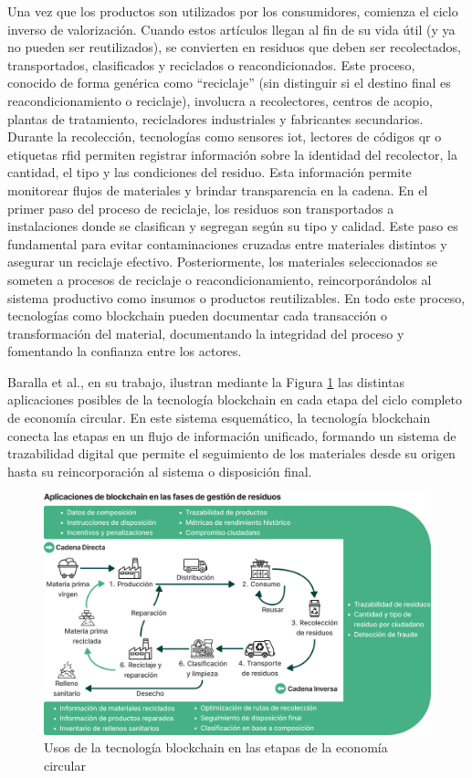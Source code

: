 Una vez que los productos son utilizados por los consumidores, comienza el ciclo inverso de valorización. Cuando estos artículos llegan al fin de su vida útil (y ya no pueden ser reutilizados), se convierten en residuos que deben ser recolectados, transportados, clasificados y reciclados o reacondicionados. Este proceso, conocido de forma genérica como ``reciclaje'' (sin distinguir si el destino final es reacondicionamiento o reciclaje), involucra a recolectores, centros de acopio, plantas de tratamiento, recicladores industriales y fabricantes secundarios. Durante la recolección, tecnologías como sensores \acrshort{iot}, lectores de códigos \acrshort{qr} o etiquetas \acrshort{rfid} permiten registrar información sobre la identidad del recolector, la cantidad, el tipo y las condiciones del residuo. Esta información permite monitorear flujos de materiales y brindar transparencia en la cadena. En el primer paso del proceso de reciclaje, los residuos son transportados a instalaciones donde se clasifican y segregan según su tipo y calidad. Este paso es fundamental para evitar contaminaciones cruzadas entre materiales distintos y asegurar un reciclaje efectivo. Posteriormente, los materiales seleccionados se someten a procesos de reciclaje o reacondicionamiento, reincorporándolos al sistema productivo como insumos o productos reutilizables. En todo este proceso, tecnologías como blockchain pueden documentar cada transacción o transformación del material, documentando la integridad del proceso y fomentando la confianza entre los actores.

Baralla et al., en su trabajo, ilustran mediante la Figura \ref{fig:baralla-model-1} las distintas aplicaciones posibles de la tecnología blockchain en cada etapa del ciclo completo de economía circular. En este sistema esquemático, la tecnología blockchain conecta las etapas en un flujo de información unificado, formando un sistema de trazabilidad digital que permite el seguimiento de los materiales desde su origen hasta su reincorporación al sistema o disposición final.

\begin{figure}[!tb]
    \centering
    \includegraphics[width=\textwidth]{Figures/baralla-model-1.png}
    \caption[Usos de la tecnología blockchain en la economía circular]{Usos de la tecnología blockchain en las etapas de la economía circular \cite{baralla2023waste}}
    \label{fig:baralla-model-1}
\end{figure}


